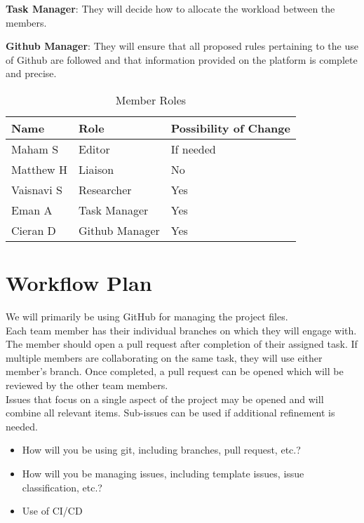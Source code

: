 \documentclass{article}
\begin{document}
\textbf{Task Manager}: They will decide how to allocate the workload between the members.

\textbf{Github Manager}: They will ensure that all proposed rules pertaining to the use of Github are followed and that information provided on the platform is complete and precise.

\begin{table}[hp]
\caption{Member Roles} \label{Proposed Assignments}
\begin{tabularx}{\textwidth}{llX}
\toprule
\textbf{Name} & \textbf{Role} & \textbf{Possibility of Change}\\
\midrule
Maham S & Editor & If needed\\
Matthew H & Liaison  & No\\
Vaisnavi S & Researcher & Yes \\
Eman A & Task Manager & Yes \\
Cieran D & Github Manager & Yes \\
\bottomrule
\end{tabularx}
\end{table}


\section{Workflow Plan}

We will primarily be using GitHub for managing the project files. \\
Each team member has their individual branches on which they will engage with. 
The member should open a pull request after completion of their assigned task. If 
multiple members are collaborating on the same task, they will use either member's branch. Once completed, 
a pull request can be opened which will be reviewed by the other team members. \\

Issues that focus on a single aspect of the project may be opened and will combine
all relevant items. Sub-issues can be used if additional refinement is needed.


\begin{itemize}
	\item How will you be using git, including branches, pull request, etc.?
	\item How will you be managing issues, including template issues, issue
	classification, etc.?
  \item Use of CI/CD
\end{itemize}
\end{document}
